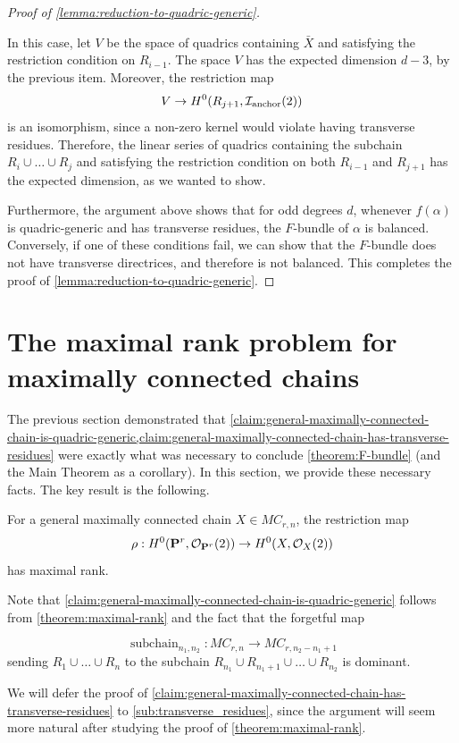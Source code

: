 \documentclass[11pt, two side, letterpaper, final]{amsart}
\renewcommand{\P}{{\bf P}}
\newcommand{\MC}{MC}
\begin{document}
\begin{proof}[Proof of \cref{lemma:reduction-to-quadric-generic}]
\begin{itemize}
	In this case, let $V$ be the space of quadrics containing $\bar{X}$ and satisfying the
	restriction condition on $R_{i-1}$. The space $V$ has the expected dimension $d-3$, by the previous item.
	Moreover, the restriction map
	\[
		V  \to 
		H^0(R_{j+1},{\mathcal I}_{\text{anchor}}(2))
	\]
	is an isomorphism, since a non-zero kernel would violate having transverse residues. Therefore, the linear
	series of quadrics containing the subchain $R_i \cup \ldots \cup R_j$ and satisfying the restriction
	condition on both $R_{i-1}$ and $R_{j+1}$ has the expected dimension, as we wanted to show.
\end{itemize}
Furthermore, the argument above shows that for odd degrees $d$, whenever $f(\alpha)$ is quadric-generic and has transverse residues, the
$F$-bundle of $\alpha$ is balanced. Conversely, if one of these conditions fail, we can show that the $F$-bundle does 
not have transverse directrices, and therefore is not balanced.
This completes the proof of \cref{lemma:reduction-to-quadric-generic}.
\end{proof} 

\section{The maximal rank problem for maximally connected chains} \label{sec:the_maximal_rank_problem_for_maximally_connected_chains}
The previous section demonstrated that \cref{claim:general-maximally-connected-chain-is-quadric-generic,claim:general-maximally-connected-chain-has-transverse-residues} were exactly what was necessary to conclude \cref{theorem:F-bundle} (and the Main Theorem as a corollary).
In this section, we provide these necessary facts. The key result is the following.
\begin{theorem}
\label{theorem:maximal-rank}
For a general maximally connected chain $X \in \MC_{r,n}$, the restriction map
\[
	\rho: H^0(\P^r, \sh{O}_{\P^r}(2)) \to H^0(X, \sh{O}_X(2))
\]
has maximal rank.
\end{theorem}
Note that \cref{claim:general-maximally-connected-chain-is-quadric-generic} follows from \cref{theorem:maximal-rank}
and the fact that the forgetful map

\[
	\operatorname{subchain}_{n_1,n_2}:\MC_{r,n} \to \MC_{r, n_2-n_1+1}
\]
sending $R_1 \cup \ldots \cup R_n$ to the subchain $R_{n_1} \cup R_{n_1+1} \cup \ldots \cup R_{n_2}$ is dominant.

We will defer the proof of \cref{claim:general-maximally-connected-chain-has-transverse-residues} to \cref{sub:transverse_residues}, since the argument will seem more natural after studying the proof of \cref{theorem:maximal-rank}.
\end{document}
